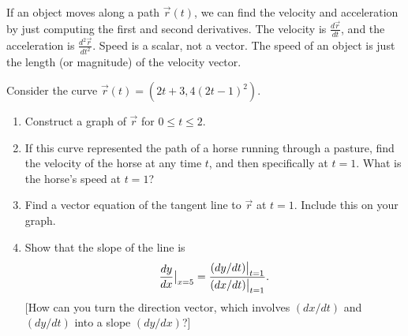 \begin{definition}\label{def:velocity acceleration}
If an object moves along a path $\vec r(t)$, we can find the velocity and acceleration by just computing the first and second derivatives. The velocity is $\frac{d\vec r}{dt}$, and the acceleration is $\frac{d^2\vec r}{dt^2}$. Speed is a scalar, not a vector. The speed of an object is just the length (or magnitude) of the velocity vector.
\end{definition}

\begin{problem}
Consider the curve $\vec r(t) = (2t+3, 4(2t-1)^2)$.
\begin{enumerate}
\item Construct a graph of $\vec r$ for $0\leq t\leq 2$. 
\item If this curve represented the path of a horse running through a pasture, find the velocity of the horse at any time $t$, and then specifically at $t=1$. What is the horse's speed at $t=1$?
\item Find a vector equation of the tangent line to $\vec r$ at $t=1$.  Include this on your graph.
\item Show that the slope of the line is 
$$\displaystyle \frac{dy}{dx}\big|_{x=5} 
= 
\frac{
(dy/dt)\big|_{t=1}
}{
(dx/dt)\big|_{t=1}
}.$$
[How can you turn the direction vector, which involves $(dx/dt)$ and $(dy/dt)$ into a slope $(dy/dx)$?]
\end{enumerate} 
\end{problem}
%
%

